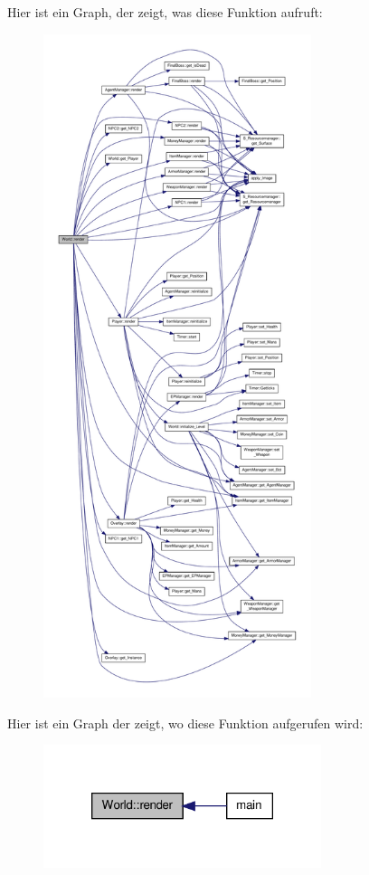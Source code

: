 Hier ist ein Graph, der zeigt, was diese Funktion aufruft\-:
\nopagebreak
\begin{figure}[H]
\begin{center}
\leavevmode
\includegraphics[height=550pt]{class_world_a15a2d4bb5a4f26400a6c1365d8eb4875_cgraph}
\end{center}
\end{figure}




Hier ist ein Graph der zeigt, wo diese Funktion aufgerufen wird\-:
\nopagebreak
\begin{figure}[H]
\begin{center}
\leavevmode
\includegraphics[width=230pt]{class_world_a15a2d4bb5a4f26400a6c1365d8eb4875_icgraph}
\end{center}
\end{figure}


